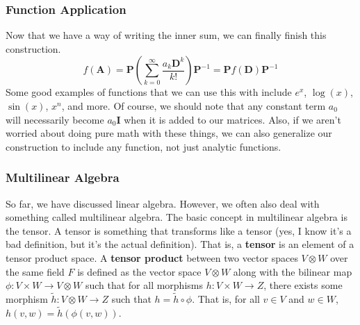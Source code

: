 \documentclass[10pt]{beamer}
\begin{document}
\begin{frame}
  \frametitle{Function Application}
  Now that we have a way of writing the inner sum, we can finally finish this construction.
  $$f(\mathbf{A}) = \mathbf{P}\left(\sum_{k=0}^\infty\frac{a_k\mathbf{D}^k}{k!}\right)\mathbf{P}^{-1} = \mathbf{P}f(\mathbf{D})\mathbf{P}^{-1}$$
  Some good examples of functions that we can use this with include $e^x$, $\log(x)$, $\sin(x)$, $x^n$, and more. Of course, we should note that any constant term $a_0$ will necessarily become $a_0\mathbf{I}$ when it is added to our matrices. Also, if we aren't worried about doing pure math with these things, we can also generalize our construction to include any function, not just analytic functions.
\end{frame}

\begin{frame}
  \frametitle{Multilinear Algebra}
  So far, we have discussed linear algebra. However, we often also deal with something called multilinear algebra. The basic concept in multilinear algebra is the tensor. A tensor is something that transforms like a tensor (yes, I know it's a bad definition, but it's the actual definition). That is, a \textbf{tensor} is an element of a tensor product space. A \textbf{tensor product} between two vector spaces $V\otimes W$ over the same field $F$ is defined as the vector space $V \otimes W$ along with the bilinear map $\phi: V\times W \rightarrow V\otimes W$ such that for all morphisms $h:V\times W\rightarrow Z$, there exists some morphism $\tilde{h}:V\otimes W\rightarrow Z$ such that $h = \tilde{h} \circ \phi$. That is, for all $v\in V$ and $w\in W$, $h(v, w) = \tilde{h}(\phi(v, w))$.
\end{frame}
\end{document}
